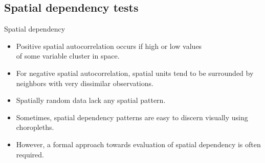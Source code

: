 \documentclass{beamer}
\begin{document}
\subsection{Spatial dependency tests}
\begin{frame}{Spatial dependency}
\begin{itemize}
    \item Positive spatial autocorrelation occurs if high or low values \\of some variable cluster in space. \medskip
    \item For negative spatial autocorrelation, spatial units tend to be surrounded by neighbors with very dissimilar observations. 
    \medskip
    \item Spatially random data lack any spatial pattern.
    \medskip
    \item Sometimes, spatial dependency patterns are easy to discern visually using choropleths. 
    \medskip
    \item However, a formal approach towards evaluation of spatial dependency is often required.
\end{itemize}
\end{frame}
\end{document}
